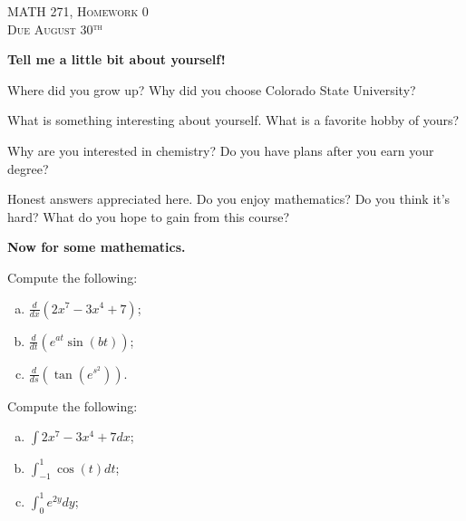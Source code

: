 \documentclass[12pt]{article} %
\begin{document}
\begin{center}
   \textsc{\large MATH 271, Homework 0}\\
   \textsc{Due August 30$^\textrm{th}$}
\end{center}

\begin{center}
    \textbf{Tell me a little bit about yourself!}
\end{center}

\begin{question}
    Where did you grow up? Why did you choose Colorado State University?
\end{question}

\begin{question}
    What is something interesting about yourself.  What is a favorite hobby of yours?
\end{question}

\begin{question}
    Why are you interested in chemistry? Do you have plans after you earn your degree?
\end{question}

\begin{question}
    Honest answers appreciated here.  Do you enjoy mathematics? Do you think it's hard? What do you hope to gain from this course?
\end{question}


\begin{center}
    \textbf{Now for some mathematics.}
\end{center}

\begin{problem}
    Compute the following:
\begin{enumerate}[(a)]
    \item $\displaystyle{\frac{d}{dx}(2x^7-3x^4+7)}$;
    \item $\displaystyle{\frac{d}{dt}\left(e^{at}\sin(bt)\right)}$;
    \item $\displaystyle{\frac{d}{ds}\left(\tan\left( e^{s^2}\right)\right)}$.
\end{enumerate}
\end{problem}

\begin{problem}
    Compute the following:
\begin{enumerate}[(a)]
    \item $\displaystyle{\int 2x^7-3x^4+7dx}$;
    \item $\displaystyle{\int_{-1}^1 \cos(t) dt}$;
    \item $\displaystyle{\int_0^1 e^{2y}dy}$;
\end{enumerate}
\end{problem}
\end{document}
